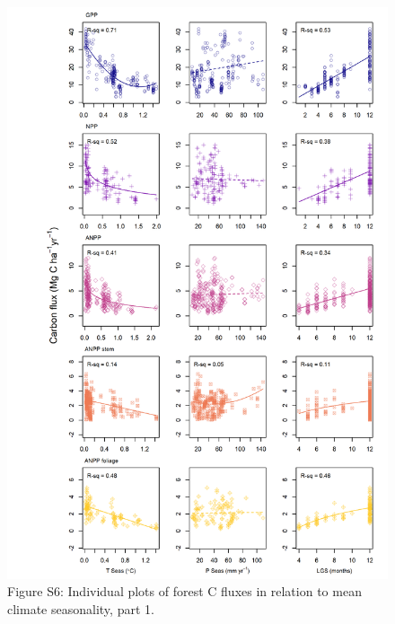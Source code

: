 \documentclass[
]{article}
\begin{document}
\begin{figure}[H]
\includegraphics[height=0.95\textheight]{tables_figures/grid_plots_seasonality3} \caption{Figure S6: Individual plots of forest C fluxes in relation to mean climate seasonality, part 1.}\label{fig:unnamed-chunk-14}
\end{figure}
\end{document}
